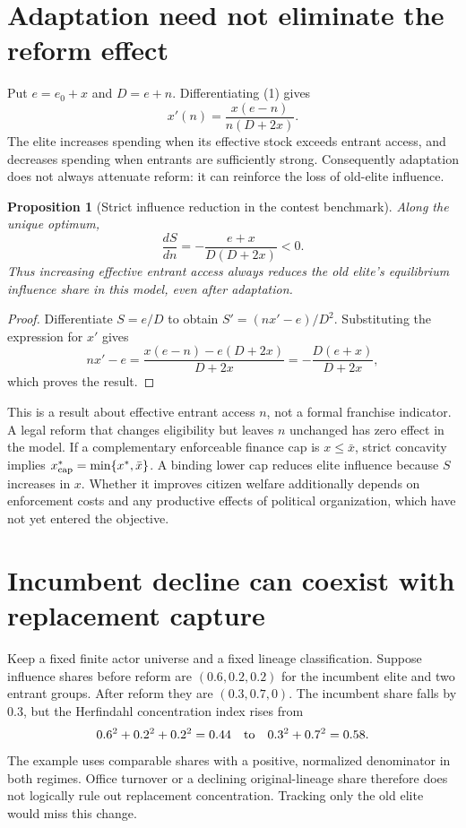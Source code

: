 \documentclass[11pt]{article}
\newtheorem{proposition}{Proposition}
\begin{document}
\section*{Adaptation need not eliminate the reform effect}
Put $e=e_0+x$ and $D=e+n$. Differentiating (1) gives
\[
 x'(n)=\frac{x(e-n)}{n(D+2x)}.
\]
The elite increases spending when its effective stock exceeds entrant access, and decreases spending when entrants are sufficiently strong. Consequently adaptation does not always attenuate reform: it can reinforce the loss of old-elite influence.

\begin{proposition}[Strict influence reduction in the contest benchmark]
Along the unique optimum,
\[
 \frac{dS}{dn}=-\frac{e+x}{D(D+2x)}<0.
\]
Thus increasing effective entrant access always reduces the old elite's equilibrium influence share in this model, even after adaptation.
\end{proposition}
\begin{proof}
Differentiate $S=e/D$ to obtain $S'=(nx'-e)/D^2$. Substituting the expression for $x'$ gives
\[
 nx'-e=\frac{x(e-n)-e(D+2x)}{D+2x}
 =-\frac{D(e+x)}{D+2x},
\]
which proves the result.
\end{proof}

This is a result about effective entrant access $n$, not a formal franchise indicator. A legal reform that changes eligibility but leaves $n$ unchanged has zero effect in the model. If a complementary enforceable finance cap is $x\leq\bar x$, strict concavity implies $x^*_{\rm cap}=\min\{x^*,\bar x\}$. A binding lower cap reduces elite influence because $S$ increases in $x$. Whether it improves citizen welfare additionally depends on enforcement costs and any productive effects of political organization, which have not yet entered the objective.

\section*{Incumbent decline can coexist with replacement capture}
Keep a fixed finite actor universe and a fixed lineage classification. Suppose influence shares before reform are $(0.6,0.2,0.2)$ for the incumbent elite and two entrant groups. After reform they are $(0.3,0.7,0)$. The incumbent share falls by $0.3$, but the Herfindahl concentration index rises from
\[
 0.6^2+0.2^2+0.2^2=0.44
 \quad\hbox{to}\quad 0.3^2+0.7^2=0.58.
\]
The example uses comparable shares with a positive, normalized denominator in both regimes. Office turnover or a declining original-lineage share therefore does not logically rule out replacement concentration. Tracking only the old elite would miss this change.
\end{document}
